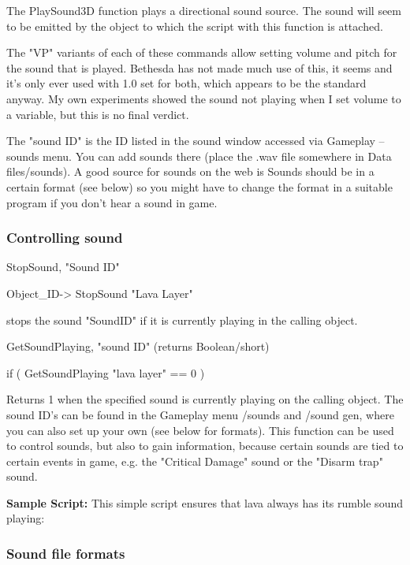 The PlaySound3D function plays a directional sound source. The sound
will seem to be emitted by the object to which the script with this
function is attached.

The "VP" variants of each of these commands allow setting volume and
pitch for the sound that is played. Bethesda has not made much use of
this, it seems and it's only ever used with 1.0 set for both, which
appears to be the standard anyway. My own experiments showed the sound
not playing when I set volume to a variable, but this is no final
verdict.

The "sound ID" is the ID listed in the sound window accessed via
Gameplay -- sounds menu. You can add sounds there (place the .wav file
somewhere in Data files/sounds). A good source for sounds on the web is
Sounds should be in a certain format (see below) so you might have to change the format in a suitable program if you don't hear a sound in game.

\hypertarget{controlling-sound}{%
\subsubsection{Controlling sound}\label{controlling-sound}}

StopSound, "Sound ID"

Object\_ID-> StopSound "Lava Layer"

stops the sound "SoundID" if it is currently playing in the calling
object.

GetSoundPlaying, "sound ID" (returns Boolean/short)

if ( GetSoundPlaying "lava layer" == 0 )

Returns 1 when the specified sound is currently playing on the calling
object. The sound ID's can be found in the Gameplay menu /sounds and
/sound gen, where you can also set up your own (see below for formats).
This function can be used to control sounds, but also to gain
information, because certain sounds are tied to certain events in game,
e.g. the "Critical Damage" sound or the "Disarm trap" sound.

\textbf{Sample Script:} This simple script ensures that lava always has
its rumble sound playing:



\hypertarget{sound-file-formats}{%
\subsubsection{Sound file formats}\label{sound-file-formats}}


